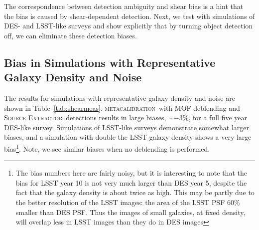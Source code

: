 \documentclass[iop, twocolappendix, appendixfloats, numberedappendix, apj]{hackemulateapj}
\newcommand{\mcal}{\textsc{metacalibration}}
\newcommand{\sx}{\textsc{Source Extractor}}
\begin{document}
The correspondence between detection ambiguity and shear bias is a hint that
the bias is caused by shear-dependent detection. Next, we test with simulations
of DES- and LSST-like surveys and show explicitly that by turning object
detection off, we can eliminate these detection biases.


\subsection{Bias in Simulations with Representative Galaxy Density and Noise}

The results for simulations with representative galaxy density and noise are
shown in Table~\ref{tab:shearmeas}.  \mcal\ with MOF deblending and \sx\
detections results in large biases, $\sim-3\%$, for a full five year
DES-like survey. Simulations of LSST-like surveys demonstrate somewhat larger
biases, and a simulation with double the LSST galaxy density shows a very large
bias\footnote{The bias numbers here are fairly noisy, but it is interesting to
note that the bias for LSST year 10 is not very much larger than DES year 5,
despite the fact that the galaxy density is about twice as high.  This may be
partly due to the better resolution of the LSST images: the area of the LSST
PSF 60\% smaller than DES PSF.  Thus the images of
small galaxies, at fixed density, will overlap less in LSST images than they do
in DES images}.  Note, we see similar biases when no deblending is performed.
\end{document}
